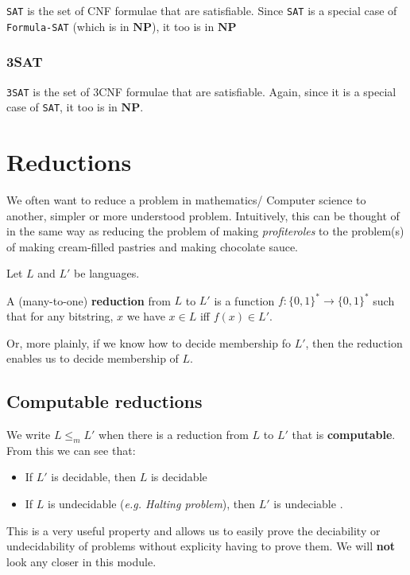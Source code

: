 \documentclass{article}
\newcommand{\NP}{\mathbf{NP}}
\begin{document}
\texttt{SAT} is the set of CNF formulae that are satisfiable. Since \texttt{SAT} is a special case of \texttt{Formula-SAT} (which is in $\NP$), it too is in $\NP$

\subsubsection{3SAT}
\label{subsubsec:3sat}

\texttt{3SAT} is the set of 3CNF formulae that are satisfiable. Again, since it is a special case of \texttt{SAT}, it too is in $\NP$.

\section{Reductions}
\label{sec:reductions}

We often want to reduce a problem in mathematics/ Computer science to another, simpler or more understood problem. Intuitively, this can be thought of in the same way as reducing the problem of making \textit{profiteroles} to the problem(s) of making cream-filled pastries and making chocolate sauce.

Let $L$ and $L'$ be languages.

A (many-to-one) \textbf{reduction} from $L$ to $L '$ is a function $f : \{ 0,1 \} ^{*} \rightarrow \{ 0,1 \}^{*} $ such that for any bitstring, $x$ we have $x \in L$ iff $f(x) \in L '$.

Or, more plainly, if we know how to decide membership fo $L '$, then the reduction enables us to decide membership of $L$.

\subsection{Computable reductions}
\label{subsec:comp-reductions}

We write $L \leq_{m} L '$ when there is a reduction from $L$ to $L '$ that is \textbf{computable}. From this we can see that:

\begin{itemize}
  \item If $L '$ is decidable, then $L$ is decidable
  \item If $L$ is undecidable (\textit{e.g. Halting problem}), then $L '$ is undeciable .
\end{itemize}

This is a very useful property and allows us to easily prove the deciability or undecidability of problems without explicity having to prove them. We will \textbf{not} look any closer in this module.
\end{document}
